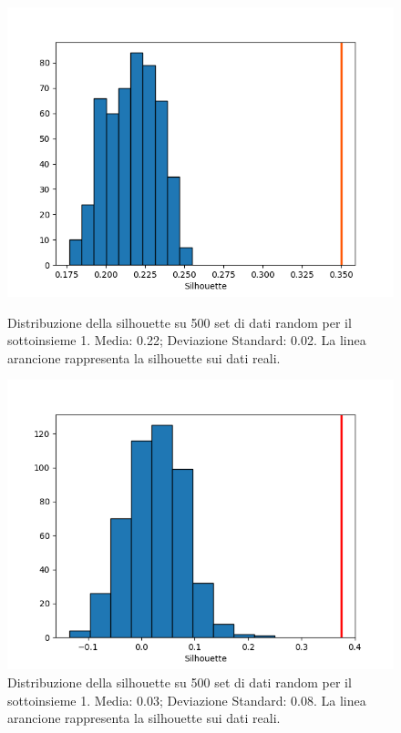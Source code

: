 \documentclass[a4paper,9pt]{article}
\begin{document}
\begin{figure}[H]
  \centering
  \begin{minipage}{.45\textwidth}
    \centering
    \includegraphics[width=\textwidth]{validation_hierDF1(ward).png}
    \caption{Distribuzione della silhouette su 500 set di dati random per il sottoinsieme 1. Media: 0.22; Deviazione Standard: 0.02. La linea arancione rappresenta la silhouette sui dati reali.}
  \end{minipage}
  \begin{minipage}{.45\textwidth}
    \centering
    \includegraphics[width=\textwidth]{validation_silhouettehierdf2(median).png}
    \caption{Distribuzione della silhouette su 500 set di dati random per il sottoinsieme 1. Media: 0.03; Deviazione Standard: 0.08. La linea arancione rappresenta la silhouette sui dati reali. }
  \end{minipage}
  \end{figure}
\end{document}
